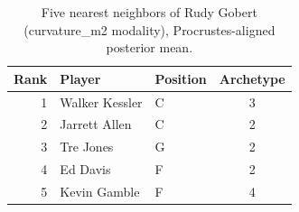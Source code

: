 \begin{table}[htbp]
  \centering\small
  \begin{tabular}{rllc}
    \toprule
    Rank & Player & Position & Archetype \\
    \midrule
    1 & Walker Kessler & C & 3 \\
    2 & Jarrett Allen & C & 2 \\
    3 & Tre Jones & G & 2 \\
    4 & Ed Davis & F & 2 \\
    5 & Kevin Gamble & F & 4 \\
    \bottomrule
  \end{tabular}
  \caption{Five nearest neighbors of Rudy Gobert (curvature_m2 modality), Procrustes-aligned posterior mean.}
  \label{tab:Rudy_Gobert_neighbors_curvature_m2}
\end{table}

